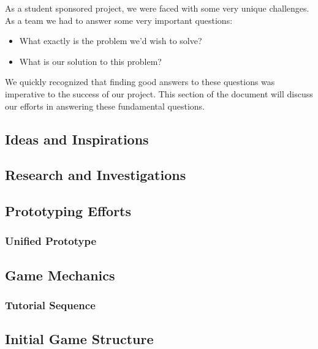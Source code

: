 As a student sponsored project, we were faced with some very unique
challenges. As a team we had to answer some very important questions: 

\begin{itemize}
    \item What exactly is the problem we'd wish to solve?
    \item What is our solution to this problem?
\end{itemize}

We quickly recognized that finding good answers to these questions was imperative to the success of our project. 
This section of the document will discuss our efforts in answering these fundamental questions.

\subsection{Ideas and Inspirations}
    
\newpage

\subsection{Research and Investigations}
  
\newpage

\subsection{Prototyping Efforts}
  
  \subsubsection{Unified Prototype}
\newpage

\subsection{Game Mechanics}
\subsubsection{Tutorial Sequence} 
  
\newpage
\subsection{Initial Game Structure}

\newpage